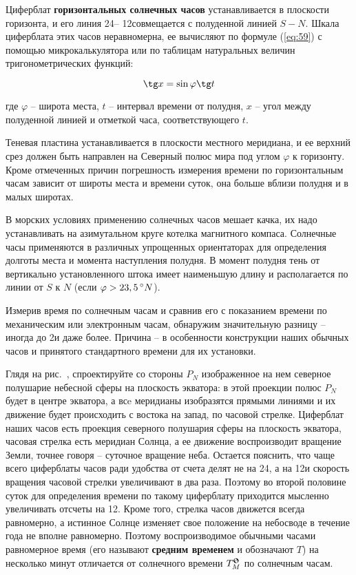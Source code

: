 Циферблат \textbf{горизонтальных солнечных часов} устанавливается в плоскости горизонта, и его линия 24\thr \--- 12\thr совмещается с полуденной линией $S-N$. Шкала циферблата этих часов неравномерна, ее вычисляют по формуле (\ref{eq:59}) с помощью микрокалькулятора или по таблицам натуральных величин тригонометрических функций: 

\begin{equation}
  \tg x = \sin \varphi \tg t \label{eq:59}
\end{equation}

где $\varphi$ \--- широта места, $t$ \--- интервал времени от полудня, $x$ \--- угол между полуденной линией и отметкой часа, соответствующего $t$.

Теневая пластина устанавливается в плоскости местного меридиана, и ее верхний срез должен быть направлен на Северный полюс мира под углом $\varphi$ к горизонту. Кроме отмеченных причин погрешность измерения времени по горизонтальным часам зависит от широты места и времени суток, она больше вблизи полудня и в малых широтах. 

В морских условиях применению солнечных часов мешает качка, их надо устанавливать на азимутальном круге котелка магнитного компаса. Солнечные часы применяются в различных упрощенных ориентаторах для определения долготы места и момента наступления полудня. В момент полудня тень от вертикально установленного штока имеет наименьшую длину и располагается по линии от $S$ к $N$ (если $\varphi > 23,5\,^\circ N$).

Измерив время по солнечным часам и сравнив его с показанием времени по механическим или электронным часам, обнаружим значительную разницу \--- иногда до 2\thr и даже более. Причина \--- в особенности конструкции наших обычных часов и принятого стандартного времени для их установки.

Глядя на рис.~, спроектируйте со стороны $P_N$ изображенное на нем северное полушарие небесной сферы на плоскость экватора: в этой проекции полюс $P_N$ будет в центре экватора, а всe меридианы изобразятся прямыми линиями и их движение будет происходить с востока на запад, по часовой стрелке. Циферблат наших часов есть проекция северного полушария сферы на плоскость экватора, часовая стрелка есть меридиан Солнца, а ее движение воспроизводит вращение Земли, точнее говоря \--- суточное вращение неба. Остается пояснить, что чаще всего циферблаты часов ради удобства от счета делят не на 24\thr, а на 12\thr и скорость вращения часовой стрелки увеличивают в два раза. Поэтому во второй половине суток для определения времени по такому циферблату приходится мысленно увеличивать отсчеты на 12\thr. Кроме того, стрелка часов движется всегда равномерно, а истинное Солнце изменяет свое положение на небосводе в течение года не вполне равномерно. Поэтому воспроизводимое обычными часами равномерное время (его называют \textbf{средним временем} и обозначают $T$) на несколько минут отличается от солнечного времени $\TSun_M$ по солнечным часам.

